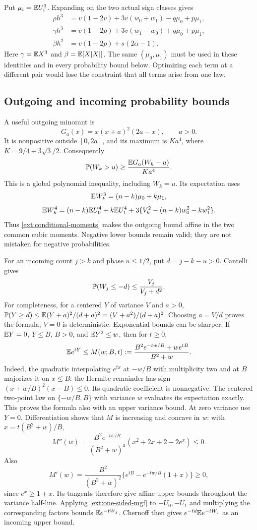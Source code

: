 Put $\mu_i=\mathbb E U_i^3$. Expanding on the two actual sign classes gives
\begin{align}
 \rho h^3&=v(1-2v)+3v(w_0+w_1)-q\mu_0+p\mu_1,
 \label{ext:conditional-rho}\\
 \gamma h^3&=v(1-2p)+3v(w_1-w_0)+q\mu_0+p\mu_1,\\
 \beta h^2&=v(1-2p)+s(2\alpha-1).
\end{align}
Here $\gamma=\mathbb E X^3$ and $\beta=\mathbb E[X|X|]$. The same
$(\mu_0,\mu_1)$ must be used in these identities and in every probability
bound below. Optimizing each term at a different pair would lose the
constraint that all terms arise from one law.

\subsection{Outgoing and incoming probability bounds}
A useful outgoing minorant is
\[
 G_a(x)=x(x+a)^2(2a-x),\qquad a>0.
\]
It is nonpositive outside $[0,2a]$, and its maximum is
$K a^4$, where $K=9/4+3\sqrt3/2$. Consequently
\[
 \mathbb P(W_k>u)\ge \frac{\mathbb E G_a(W_k-u)}{K a^4}.
\]
This is a global polynomial inequality, including $W_k=u$.
Its expectation uses
\[
 \mathbb E W_k^3=(n-k)\mu_0+k\mu_1,
\]
\[
 \mathbb E W_k^4=(n-k)\mathbb E U_0^4+k\mathbb E U_1^4
 +3\{V_k^2-(n-k)w_0^2-kw_1^2\}.
\]
Thus \eqref{ext:conditional-moments} makes the outgoing bound affine in
the two common cubic moments. Negative lower bounds remain valid; they
are not mistaken for negative probabilities.

For an incoming count $j>k$ and phase $u\le1/2$, put $d=j-k-u>0$.
Cantelli gives
\[
 \mathbb P(W_j\le-d)\le\frac{V_j}{V_j+d^2}.
\]
For completeness, for a centered $Y$ of variance $V$ and $a>0$,
$\mathbb P(Y\ge d)\le\mathbb E(Y+a)^2/(d+a)^2=(V+a^2)/(d+a)^2$.
Choosing $a=V/d$ proves the formula; $V=0$ is deterministic.
Exponential bounds can be sharper. If $\mathbb E Y=0$, $Y\le B$, $B>0$,
and $\mathbb E Y^2\le w$, then for $t\ge0$,
\begin{equation}\label{ext:one-sided-mgf}
 \mathbb E e^{tY}\le
 M(w;B,t):=\frac{B^2e^{-tw/B}+we^{tB}}{B^2+w}.
\end{equation}
Indeed, the quadratic interpolating $e^{tx}$ at $-w/B$ with multiplicity
two and at $B$ majorizes it on $x\le B$: the Hermite remainder has
sign $(x+w/B)^2(x-B)\le0$. Its quadratic coefficient is nonnegative.
The centered two-point law on $\{-w/B,B\}$ with variance $w$ evaluates
its expectation exactly. This proves the formula also with an upper
variance bound. At zero variance use $Y=0$.
Differentiation shows that $M$ is increasing and concave in $w$:
with $x=t(B^2+w)/B$,
\[
 M''(w)=\frac{B^2e^{-tw/B}}{(B^2+w)^3}
          (x^2+2x+2-2e^x)\le0.
\]
Also
\[
 M'(w)=\frac{B^2}{(B^2+w)^2}
 \{e^{tB}-e^{-tw/B}(1+x)\}\ge0,
\]
since $e^x\ge1+x$. Its tangents therefore give affine upper bounds throughout the variance
half-line. Applying \eqref{ext:one-sided-mgf} to $-U_0,-U_1$ and
multiplying the corresponding factors bounds $\mathbb E e^{-tW_j}$.
Chernoff then gives $e^{-td}\mathbb E e^{-tW_j}$ as an incoming upper bound.

